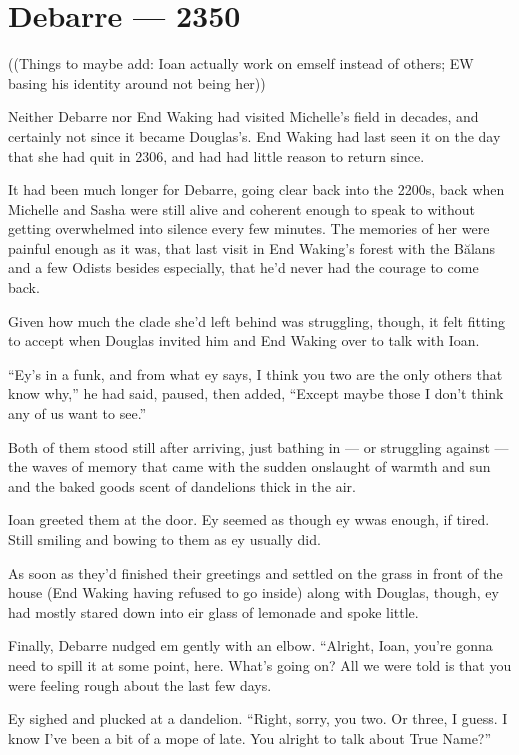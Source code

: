 \hypertarget{debarre-2350}{%
\chapter{Debarre — 2350}\label{debarre-2350}}

((Things to maybe add: Ioan actually work on emself instead of others; EW basing his identity around not being her))

Neither Debarre nor End Waking had visited Michelle's field in decades, and certainly not since it became Douglas's. End Waking had last seen it on the day that she had quit in 2306, and had had little reason to return since.

It had been much longer for Debarre, going clear back into the 2200s, back when Michelle and Sasha were still alive and coherent enough to speak to without getting overwhelmed into silence every few minutes. The memories of her were painful enough as it was, that last visit in End Waking's forest with the Bălans and a few Odists besides especially, that he'd never had the courage to come back.

Given how much the clade she'd left behind was struggling, though, it felt fitting to accept when Douglas invited him and End Waking over to talk with Ioan.

``Ey's in a funk, and from what ey says, I think you two are the only others that know why,'' he had said, paused, then added, ``Except maybe those I don't think any of us want to see.''

Both of them stood still after arriving, just bathing in — or struggling against — the waves of memory that came with the sudden onslaught of warmth and sun and the baked goods scent of dandelions thick in the air.

Ioan greeted them at the door. Ey seemed as though ey wwas enough, if tired. Still smiling and bowing to them as ey usually did.

As soon as they'd finished their greetings and settled on the grass in front of the house (End Waking having refused to go inside) along with Douglas, though, ey had mostly stared down into eir glass of lemonade and spoke little.

Finally, Debarre nudged em gently with an elbow. ``Alright, Ioan, you're gonna need to spill it at some point, here. What's going on? All we were told is that you were feeling rough about the last few days.

Ey sighed and plucked at a dandelion. ``Right, sorry, you two. Or three, I guess. I know I've been a bit of a mope of late. You alright to talk about True Name?''

